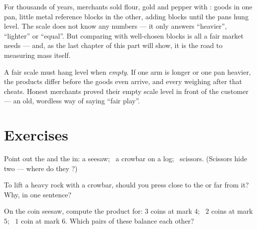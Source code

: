 \begin{example}\label{ex:g3:levers-and-scales:weighing}
For thousands of years, merchants sold flour, gold and pepper with
: goods in one pan, little metal reference blocks in
the other, adding blocks until the pans hung level. The scale does
not know any numbers --- it only answers ``heavier'', ``lighter'' or
``equal''. But comparing with well-chosen blocks is all a fair
market needs --- and, as the last chapter of this part will show, it
is the road to measuring mass itself.
\end{example}

\begin{remark}\label{rem:g3:levers-and-scales:fair}
A fair scale must hang level when \emph{empty}. If one arm is longer
or one pan heavier, the products differ before the goods even
arrive, and every weighing after that cheats. Honest merchants
proved their empty scale level in front of the customer --- an old,
wordless way of saying ``fair play''.
\end{remark}

\section{Exercises}

\begin{exercise}[$\star$]\label{exo:g3:levers-and-scales:1}
Point out the  and the  in: a seesaw; \ a crowbar on a
log; \ scissors. (Scissors hide two  --- where do they
?)
\end{exercise}

\begin{exercise}[$\star$]\label{exo:g3:levers-and-scales:2}
To lift a heavy rock with a crowbar, should you press close to the
 or far from it? Why, in one sentence?
\end{exercise}

\begin{exercise}[$\star$]\label{exo:g3:levers-and-scales:3}
On the coin seesaw, compute the product for: $3$ coins at mark $4$;
\ $2$ coins at mark $5$; \ $1$ coin at mark $6$. Which pairs of
these balance each other?
\end{exercise}

